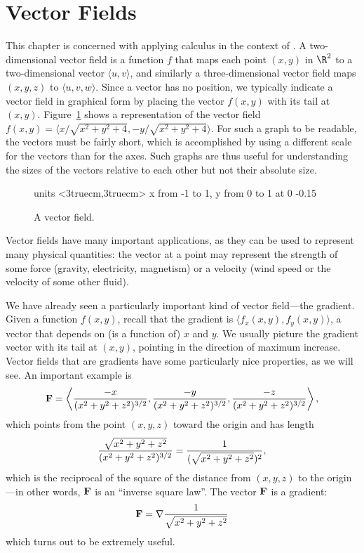 \section{Vector Fields}\label{sec:VectorFields}

This chapter is concerned with applying calculus in the context of 
. A two-dimensional vector
field is a function $f$ that maps each point $(x,y)$ in $\R^2$ to a
two-dimensional vector $\langle u,v\rangle$, and similarly a
three-dimensional vector field maps $(x,y,z)$ to $\langle
u,v,w\rangle$. Since a vector has no position, we typically indicate a
vector field in graphical form by placing the vector $f(x,y)$ with its
tail at $(x,y)$. Figure~\ref{fig:vector field} shows a
representation of the vector field 
$f(x,y)=\langle x/\sqrt{x^2+y^2+4},-y/\sqrt{x^2+y^2+4}\rangle$.
For such a graph to be readable, the vectors must be fairly short,
which is accomplished by using a different scale for the vectors than
for the axes. Such graphs are thus useful for understanding the sizes
of the vectors relative to each other but not their absolute size.


\begin{figure}[H]
\centerline{
\vbox{\beginpicture
\normalgraphs
\setcoordinatesystem units <3truecm,3truecm>
\setplotarea x from -1 to 1, y from 0 to 1
 at 0 -0.15
\endpicture}}
\caption{A vector field. \label{fig:vector field}}
\end{figure}

Vector fields have many important applications, as they can be used to
represent many physical quantities: the vector at a point may
represent the strength of some force (gravity, electricity, magnetism) or
a velocity (wind speed or the velocity of some other fluid). 

We have already seen a particularly important kind of vector
field---the gradient. Given a function $f(x,y)$, recall that the
gradient is $\langle f_x(x,y),f_y(x,y)\rangle$, a vector that depends
on (is a function of) $x$ and $y$. We usually picture the gradient
vector with its tail at $(x,y)$, pointing in the direction of maximum
increase. Vector fields that are gradients have some particularly nice
properties, as we will see.
An important example is 
$${\bf F}=
\left
\langle {-x\over (x^2+y^2+z^2)^{3/2}},{-y\over (x^2+y^2+z^2)^{3/2}},{-z\over
  (x^2+y^2+z^2)^{3/2}}\right\rangle,$$
which points from the point $(x,y,z)$ toward the origin and has length
$${\sqrt{x^2+y^2+z^2}\over(x^2+y^2+z^2)^{3/2}}=
{1\over(\sqrt{x^2+y^2+z^2})^2},$$
which is the reciprocal of the square of the distance from $(x,y,z)$
to the origin---in other words, ${\bf F}$ is an ``inverse square
law''.
The vector $\bf F$ is a gradient:
\begin{equation}\label{eq:inverse square field as gradient}
{\bf F} = \nabla {1\over\sqrt{x^2+y^2+z^2} }
\end{equation}
which turns out to be extremely useful.


